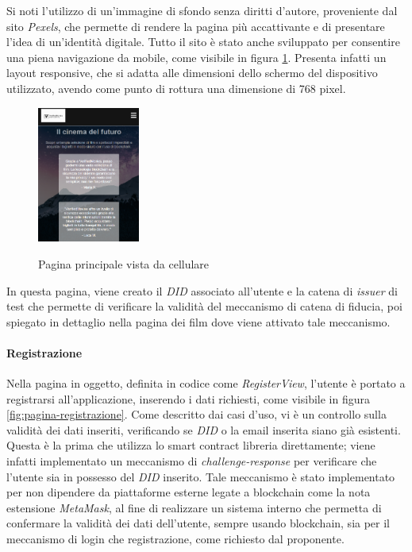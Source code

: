 Si noti l'utilizzo di un'immagine di sfondo senza diritti d'autore, proveniente dal sito \textit{Pexels}, che permette di rendere la pagina più accattivante e di presentare l'idea di un'identità digitale.
Tutto il sito è stato anche sviluppato per consentire una piena navigazione da mobile, come visibile in figura \ref{fig:pagina-principale-mobile}.
Presenta infatti un layout responsive, che si adatta alle dimensioni dello schermo del dispositivo utilizzato, avendo come punto di rottura una dimensione 
di 768 pixel.
\begin{figure}[h]
    \centering
    \includegraphics[width=0.3\textwidth, alt={Pagina principale dell'applicazione vista da cellulare}]{immagini/frontend/home-mobile.png}
    \caption{Pagina principale vista da cellulare}\label{fig:pagina-principale-mobile}
\end{figure}

In questa pagina, viene creato il \textit{DID} associato all'utente e la catena di \textit{issuer} di test che permette di verificare la validità del meccanismo di catena di fiducia,
poi spiegato in dettaglio nella pagina dei film dove viene attivato tale meccanismo. 

\paragraph{Registrazione}

Nella pagina in oggetto, definita in codice come \textit{RegisterView}, l'utente è portato a registrarsi all'applicazione, inserendo i dati richiesti, come visibile in figura \ref{fig:pagina-registrazione}.
Come descritto dai casi d'uso, vi è un controllo sulla validità dei dati inseriti, verificando se \textit{DID} o la email inserita siano già esistenti.
Questa è la prima che utilizza lo smart contract libreria direttamente; viene infatti implementato un meccanismo di \textit{challenge-response}
per verificare che l'utente sia in possesso del \textit{DID} inserito. Tale meccanismo è stato implementato per non dipendere da piattaforme esterne legate a blockchain
come la nota estensione \textit{MetaMask}, al fine di realizzare un sistema interno che permetta di confermare la validità dei dati dell'utente, sempre usando blockchain,
sia per il meccanismo di login che registrazione, come richiesto dal proponente. 

